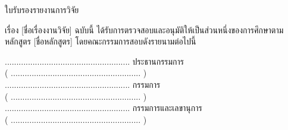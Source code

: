 \begin{center}
{\hOneSize ใบรับรองรายงานการวิจัย}
\end{center}
\vspace{12pt}

\noindent เรื่อง [ชื่อเรื่องงานวิจัย] ฉบับนี้ ได้รับการตรวจสอบและอนุมัติให้เป็นส่วนหนึ่งของการศึกษาตามหลักสูตร
[ชื่อหลักสูตร] โดยคณะกรรมการสอบดังรายนามต่อไปนี้

\vspace{18pt}
\begin{flushleft}
......................................................  ประธานกรรมการ\\[4pt]
\hspace{1.5cm}( ........................................................ )\\[18pt]

......................................................  กรรมการ\\[4pt]
\hspace{1.5cm}( ........................................................ )\\[18pt]

......................................................  กรรมการและเลขานุการ\\[4pt]
\hspace{1.5cm}( ........................................................ )
\end{flushleft}
